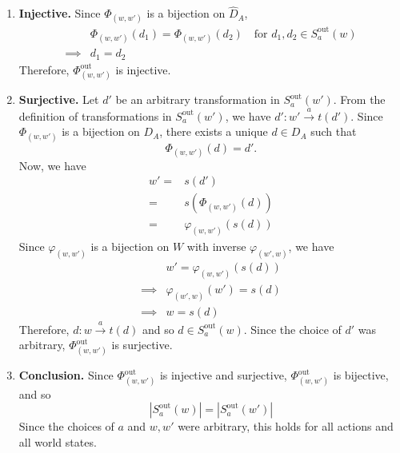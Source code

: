 \begin{proofE}
\begin{enumerate}
\begin{enumerate}
        \item \textbf{Injective.}
        Since $\Phi_{(w, w')}$ is a bijection on $\hat{D}_{A}$,
        \begin{align}
            & \Phi_{(w, w')}(d_{1}) = \Phi_{(w, w')}(d_{2}) \quad \text{for $d_{1}, d_{2} \in S_{a}^{\text{out}}(w)$} \\
            \implies & d_{1} = d_{2}
        \end{align}
        Therefore, $\Phi_{(w, w')}^{\text{out}}$ is injective.

        \item \textbf{Surjective.}
        Let $d'$ be an arbitrary transformation in $S_{a}^{\text{out}}(w')$.
        From the definition of transformations in $S_{a}^{\text{out}}(w')$, we have $d': w' \xrightarrow{a} t(d')$.
        Since $\Phi_{(w, w')}$ is a bijection on $D_{A}$, there exists a unique $d \in D_{A}$ such that
        \begin{equation}
            \Phi_{(w, w')}(d) = d'.
        \end{equation}
        Now, we have
        \begin{align}
            w' = & s(d') \\
            = & s(\Phi_{(w, w')}(d)) \\
            = & \varphi_{(w, w')}(s(d))
        \end{align}
        Since $\varphi_{(w, w')}$ is a bijection on $W$ with inverse $\varphi_{(w', w)}$, we have
        \begin{align}
            & w' = \varphi_{(w, w')}(s(d)) \\
            \implies & \varphi_{(w', w)}(w') = s(d) \\
            \implies & w = s(d)
        \end{align}
        Therefore, $d: w \xrightarrow{a} t(d)$ and so $d \in S_{a}^{\text{out}}(w)$.
        Since the choice of $d'$ was arbitrary, $\Phi_{(w, w')}^{\text{out}}$ is surjective.

        \item \textbf{Conclusion.}
        Since $\Phi_{(w, w')}^{\text{out}}$ is injective and surjective, $\Phi_{(w, w')}^{\text{out}}$ is bijective, and so
        \begin{equation}
            |S_{a}^{\text{out}}(w)| = |S_{a}^{\text{out}}(w')|
        \end{equation}
        Since the choices of $a$ and $w, w'$ were arbitrary, this holds for all actions and all world states.
    \end{enumerate}


\end{enumerate}
\end{proofE}
